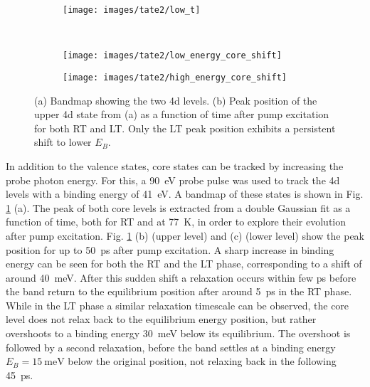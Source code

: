 \begin{figure}[t!]
	\centering
	\begin{subfigure}[b]{0.33\textwidth}
		\texttt{[image: images/tate2/low\_t]}
		\caption{}
	\end{subfigure}
	\\
	\begin{subfigure}[b]{0.49\textwidth}
		\texttt{[image: images/tate2/low\_energy\_core\_shift]}
		\caption{}
	\end{subfigure}
	\hfill
	\begin{subfigure}[b]{0.49\textwidth}
		\texttt{[image: images/tate2/high\_energy\_core\_shift]}
		\caption{}
	\end{subfigure}
	\caption{(a) Bandmap showing the two  4d levels. (b) Peak position of the upper 4d state from (a) as a function of time after pump excitation for both RT and LT. Only the LT peak position exhibits a persistent shift to lower $E_B$.}
	\label{fig:tate_core}
\end{figure}

In addition to the valence states, core states can be tracked by increasing the probe photon energy.
For this, a \qty{90}{\electronvolt} probe pulse was used to track the  4d levels with a binding energy of \qty{41}{\electronvolt}.
A bandmap of these states is shown in Fig. \ref{fig:tate_core} (a).
The peak of both core levels is extracted from a double Gaussian fit as a function of time, both for RT and at \qty{77}{\kelvin}, in order to explore their evolution after pump excitation.
Fig. \ref{fig:tate_core} (b) (upper level) and (c) (lower level) show the peak position for up to \qty{50}{\pico\second} after pump excitation.
A sharp increase in binding energy can be seen for both the RT and the LT phase, corresponding to a shift of around \qty{40}{\milli\electronvolt}.
After this sudden shift a relaxation occurs within few \unit{\pico\second} before the band return to the equilibrium position after around \qty{5}{\pico\second} in the RT phase.
While in the LT phase a similar relaxation timescale can be observed, the core level does not relax back to the equilibrium energy position, but rather overshoots to a binding energy \qty{30}{\milli\electronvolt} below its equilibrium.
The overshoot is followed by a second relaxation, before the band settles at a binding energy $E_B=\qty{15}{\milli\electronvolt}$ below the original position, not relaxing back in the following \qty{45}{\pico\second}.


